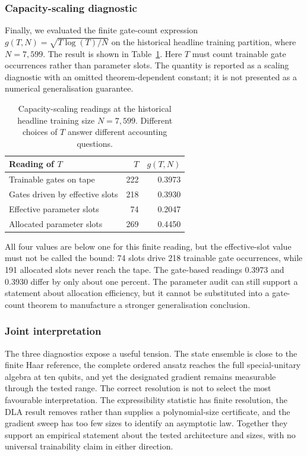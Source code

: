 \documentclass[conference]{IEEEtran}
\begin{document}
\subsubsection{Capacity-scaling diagnostic}
Finally, we evaluated the finite gate-count expression
$g(T,N)=\sqrt{T\log(T)/N}$ on the historical headline training partition,
where $N=7,599$. The result is shown in Table~\ref{tab:generalization}. Here
$T$ must count trainable gate occurrences rather than parameter slots. The
quantity is reported as a scaling diagnostic with an omitted theorem-dependent
constant; it is not presented as a numerical generalisation guarantee.

\begin{table}[!t]
\caption{Capacity-scaling readings at the historical headline training size $N=7,599$. Different choices of $T$ answer different accounting questions.}
\label{tab:generalization}
\centering
\small
\begin{tabular}{@{}lrr@{}}
\toprule
\textbf{Reading of $T$} & \textbf{$T$} & \textbf{$g(T,N)$} \\
\midrule
Trainable gates on tape & 222 & 0.3973 \\
Gates driven by effective slots & 218 & 0.3930 \\
Effective parameter slots & 74 & 0.2047 \\
Allocated parameter slots & 269 & 0.4450 \\
\bottomrule
\end{tabular}
\end{table}

All four values are below one for this finite reading, but the effective-slot
value must not be called the bound: 74 slots drive 218 trainable gate
occurrences, while 191 allocated slots never reach the tape. The gate-based
readings 0.3973 and 0.3930 differ by only about one percent. The parameter
audit can still support a statement about allocation efficiency, but it cannot
be substituted into a gate-count theorem to manufacture a stronger
generalisation conclusion.

\subsubsection{Joint interpretation}
The three diagnostics expose a useful tension. The state ensemble is close to
the finite Haar reference, the complete ordered ansatz reaches the full
special-unitary algebra at ten qubits, and yet the designated gradient remains
measurable through the tested range. The correct resolution is not to select
the most favourable interpretation. The expressibility statistic has finite
resolution, the DLA result removes rather than supplies a polynomial-size
certificate, and the gradient sweep has too few sizes to identify an
asymptotic law. Together they support an empirical statement about the tested
architecture and sizes, with no universal trainability claim in either
direction.
\end{document}
